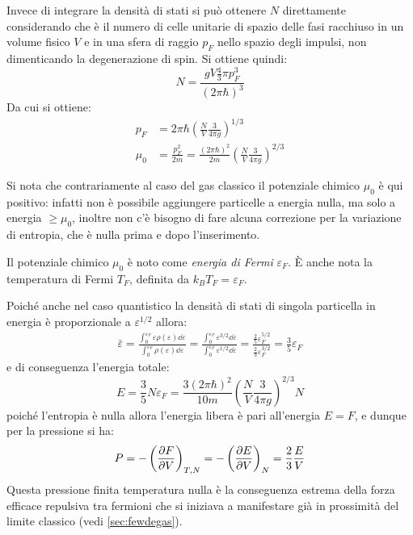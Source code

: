 Invece di integrare la densità di stati si può ottenere $N$ direttamente considerando che è il numero di celle unitarie di spazio delle fasi racchiuso in un volume fisico $V$ e in una sfera di raggio $p_F$ nello spazio degli impulsi, non dimenticando la degenerazione di spin. Si ottiene quindi:
\begin{equation*}
N = \frac{gV \frac{4}{3} \pi p_F^3}{(2\pi \hbar)^3}
\end{equation*}
Da cui si ottiene:
\begin{align*}
p_F &= 2\pi \hbar \left(\frac{N}{V} \frac{3}{4\pi g}\right)^{1/3}\\
\mu_0 &= \frac{p_F^2}{2m} = \frac{(2\pi \hbar)^2}{2m} \left(\frac{N}{V} \frac{3}{4\pi g}\right)^{2/3}
\end{align*}

Si nota che contrariamente al caso del gas classico il potenziale chimico $\mu_0$ è qui positivo: infatti non è possibile aggiungere particelle a energia nulla, ma solo a energia $\geq \mu_0$, inoltre non c'è bisogno di fare alcuna correzione per la variazione di entropia, che è nulla prima e dopo l'inserimento.

Il potenziale chimico $\mu_0$ è noto come \textit{energia di Fermi} $\varepsilon_F$. \`E anche nota la temperatura di Fermi $T_F$, definita da $k_B T_F = \varepsilon_F$.
\newline

Poiché anche nel caso quantistico la densità di stati di singola particella in energia è proporzionale a $\varepsilon^{1/2}$ allora:
\begin{align*}
	\bar{\varepsilon} = \frac{\int_{0}^{\varepsilon_F} \varepsilon \rho(\varepsilon) \dd \varepsilon}{\int_{0}^{\varepsilon_F} \rho(\varepsilon) \dd \varepsilon} = \frac{\int_{0}^{\varepsilon_F} \varepsilon^{3/2} \dd \varepsilon}{\int_{0}^{\varepsilon_F} \varepsilon^{1/2} \dd \varepsilon} = \frac{\frac{2}{5} \varepsilon_F^{5/2}}{\frac{2}{3} \varepsilon_F^{3/2}} = \frac{3}{5} \varepsilon_F
\end{align*}
e di conseguenza l'energia totale:
\begin{equation*}
E = \frac{3}{5} N \varepsilon_F = \frac{3(2\pi \hbar)^2}{10m} \left(\frac{N}{V} \frac{3}{4\pi g}\right)^{2/3} N
\end{equation*}
poiché l'entropia è nulla allora l'energia libera è pari all'energia $E=F$, e dunque per la pressione si ha:
\begin{equation}
P = - \left(\frac{\partial {F}}{\partial {V}}\right)_{T,N} = - \left(\frac{\partial {E}}{\partial {V}}\right)_{N} = \frac{2}{3} \frac{E}{V}
\end{equation}
Questa pressione finita temperatura nulla è la conseguenza estrema della forza efficace repulsiva tra fermioni che si iniziava a manifestare già in prossimità del limite classico (vedi \cref{sec:fewdegas}).

